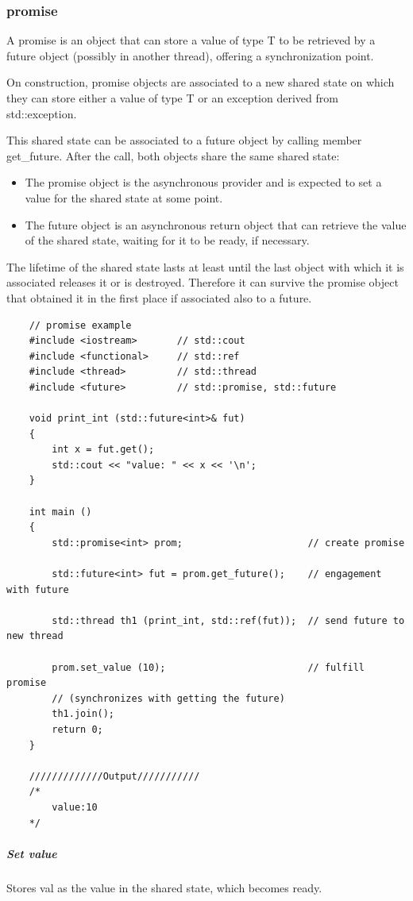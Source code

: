 \documentclass[UTF8,a4paper,12pt]{ctexbook}
\begin{document}
		\subsubsection{promise}A promise is an object that can store a value of type T to be retrieved by a future object (possibly in another thread), offering a synchronization point.
		
		On construction, promise objects are associated to a new shared state on which they can store either a value of type T or an exception derived from std::exception.
		
		This shared state can be associated to a future object by calling member get\_future. After the call, both objects share the same shared state:
		\begin{itemize}[itemindent = 1em]
			\item  The promise object is the asynchronous provider and is expected to set a value for the shared state at some point.
			\item  The future object is an asynchronous return object that can retrieve the value of the shared state, waiting for it to be ready, if necessary.
		\end{itemize}

		The lifetime of the shared state lasts at least until the last object with which it is associated releases it or is destroyed. Therefore it can survive the promise object that obtained it in the first place if associated also to a future.	
		
\begin{lstlisting}
	// promise example
	#include <iostream>       // std::cout
	#include <functional>     // std::ref
	#include <thread>         // std::thread
	#include <future>         // std::promise, std::future
	
	void print_int (std::future<int>& fut) 
	{
		int x = fut.get();
		std::cout << "value: " << x << '\n';
	}
	
	int main ()
	{
		std::promise<int> prom;                      // create promise
		
		std::future<int> fut = prom.get_future();    // engagement with future
		
		std::thread th1 (print_int, std::ref(fut));  // send future to new thread
		
		prom.set_value (10);                         // fulfill promise
		// (synchronizes with getting the future)
		th1.join();
		return 0;
	}
	
	/////////////Output///////////
	/*
		value:10
	*/
\end{lstlisting}
			\subparagraph{Set value}Stores val as the value in the shared state, which becomes ready.
			
\end{document}
